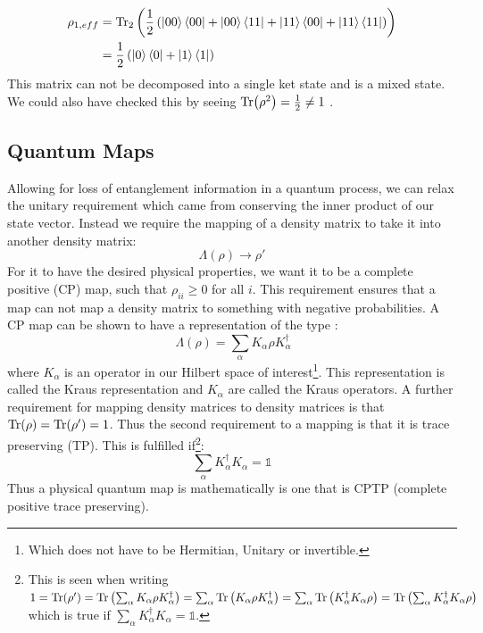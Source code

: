\begin{align}
    \rho_{1, eff}   &= \Tr_2 \left(\frac12 \left(\ket{00}\bra{00} + \ket{00}\bra{11} + \ket{11}\bra{00} + \ket{11}\bra{11} \right) \right) \\
                    &= \frac12 \left(\ket{0}\bra{0} + \ket{1}\bra{1} \right)
\end{align}
This matrix can not be decomposed into a single ket state and is a mixed state. We could also have checked this by seeing $\Tr(\rho^2) = \frac12\neq1$ \cite{manzano_short_2020}. 
 
\subsection{Quantum Maps}
Allowing for loss of entanglement information in a quantum process, we can relax the unitary requirement which came from conserving the inner product of our state vector. Instead we require the mapping of a density matrix to take it into another density matrix:
\begin{equation}
    \Lambda(\rho) \to \rho'
\end{equation}
For it to have the desired physical properties, we want it to be a complete positive (CP) map, such that $\rho_{ii} \geq 0$ for all $i$. This requirement ensures that a map can not map a density matrix to something with negative probabilities. A CP map can be shown to have a representation of the type \cite{greenbaum_introduction_2015}:
\begin{equation}\
    \Lambda(\rho) = \sum_\alpha K_\alpha\rho K_\alpha^\dagger
\end{equation}
where $K_\alpha$ is an operator in our Hilbert space of interest\footnote{Which does not have to be Hermitian, Unitary or invertible.}. This representation is called the Kraus representation and $K_\alpha$ are called the Kraus operators. A further requirement for mapping density matrices to density matrices is that $\Tr
(\rho) = \Tr(\rho') = 1$. Thus the second requirement to a mapping is that it is trace preserving (TP). This is fulfilled if\footnote{This is seen when writing $1 = \Tr(\rho') = \Tr\left(\sum_\alpha K_\alpha\rho K_\alpha^\dagger \right) = \sum_\alpha\Tr\left(K_\alpha\rho K_\alpha^\dagger \right)= \sum_\alpha\Tr\left(K_\alpha^\dagger K_\alpha\rho  \right) = \Tr\left(\sum_\alpha K_\alpha^\dagger K_\alpha\rho  \right)$ which is true if $\sum_\alpha K_\alpha^\dagger K_\alpha = \mathbb{1}$.}:
\begin{equation}
    \sum_\alpha K_\alpha^\dagger K_\alpha = \mathbb{1}
\end{equation}
Thus a physical quantum map is mathematically is one that is CPTP (complete positive trace preserving). \cite{greenbaum_introduction_2015}

